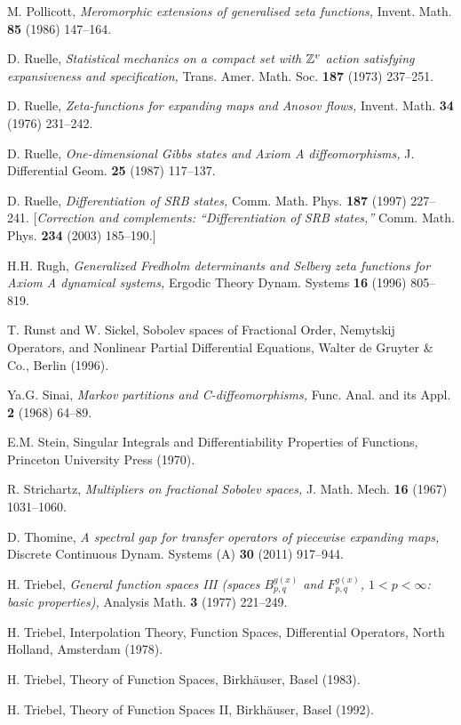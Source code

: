 \documentclass[10pt,twoside]{amsart}
\begin{document}
\begin{thebibliography}{KKPW}
 M. Pollicott, 
{\it Meromorphic extensions of generalised zeta functions,}
Invent. Math. \textbf{85} (1986) 147--164.  

 D. Ruelle,  {\it Statistical mechanics on a compact set with $\mathbb{Z}^v$ action satisfying expansiveness and specification,} Trans. Amer. Math. Soc. \textbf{187} (1973) 237--251.

 D. Ruelle, 
{\it Zeta-functions for expanding maps and {A}nosov flows,}
Invent. Math. \textbf{34} (1976) 231--242.

D. Ruelle,  {\it One-dimensional {G}ibbs states and {A}xiom {A} diffeomorphisms,}
 J. Differential Geom. \textbf{25} (1987) 117--137.


 D. Ruelle,  {\it Differentiation of SRB states,} Comm. Math. Phys. 
\textbf{187} (1997) 227--241.
[{\it Correction and complements: ``Differentiation of SRB states,''}  Comm. Math. Phys. \textbf{234} (2003) 185--190.]


H.H. Rugh, 
{\it Generalized Fredholm determinants and Selberg zeta functions for Axiom A dynamical systems,} 
Ergodic Theory Dynam. Systems  \textbf{16} (1996)  805--819.


 T. Runst and W.  Sickel, 
Sobolev spaces of Fractional Order, Nemytskij
Operators, and Nonlinear Partial Differential Equations,
Walter de Gruyter \& Co., Berlin (1996).


 Ya.G. Sinai, {\it Markov partitions and C-diffeomorphisms,}  Func. Anal. and its Appl.
\textbf{2} (1968) 64--89.



 E.M. Stein, Singular Integrals and Differentiability 
Properties of Functions, Princeton University Press (1970).


R. Strichartz,  {\it Multipliers on fractional Sobolev
spaces,} J. Math. Mech. \textbf{16} (1967) 1031--1060.  


 D. Thomine, 
{\it A spectral gap for transfer operators of piecewise expanding maps,}
Discrete Continuous Dynam. Systems (A) 
\textbf{30} (2011) 917--944.

 H. Triebel, 
{\it General function spaces III (spaces $B^{g(x)}_{p,q}$
and $F^{g(x)}_{p,q}$, $1< p < \infty$: basic properties),}
Analysis Math. \textbf{3} (1977)
221--249.

  H. Triebel, 
Interpolation Theory, Function Spaces, Differential
Operators, North Holland, Amsterdam (1978).

 H. Triebel, Theory of Function Spaces,
Birkh\"auser, Basel
(1983).

 H. Triebel,  Theory of Function Spaces II,
Birkh\"auser, Basel
(1992).

\end{thebibliography}
\end{document}
